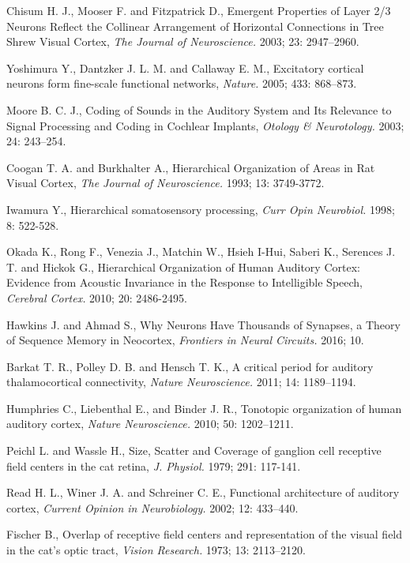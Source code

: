 \documentclass[11pt,a4paper]{article}
\begin{document}
\begin{thebibliography}{9}
  Chisum H. J., Mooser F. and Fitzpatrick D.,
  Emergent Properties of Layer 2/3 Neurons Reflect the Collinear Arrangement of Horizontal Connections in Tree Shrew Visual Cortex,
  \emph{The Journal of Neuroscience.} 2003; 23: 2947–2960.

  Yoshimura Y., Dantzker J. L. M. and Callaway E. M.,
  Excitatory cortical neurons form fine-scale functional networks,
  \emph{Nature.} 2005; 433: 868–873.

  Moore B. C. J.,
  Coding of Sounds in the Auditory System and Its Relevance to Signal Processing and Coding in Cochlear Implants,
  \emph{Otology \& Neurotology.} 2003; 24: 243–254.

  Coogan T. A. and Burkhalter A.,
  Hierarchical Organization of Areas in Rat Visual Cortex,
  \emph{The Journal of Neuroscience.} 1993; 13: 3749-3772.

  Iwamura Y.,
  Hierarchical somatosensory processing,
  \emph{Curr Opin Neurobiol.} 1998; 8: 522-528.

  Okada K., Rong F., Venezia J., Matchin W., Hsieh I-Hui, Saberi K., Serences J. T. and Hickok G.,
  Hierarchical Organization of Human Auditory Cortex: Evidence from Acoustic Invariance in the Response to Intelligible Speech,
  \emph{Cerebral Cortex.} 2010; 20: 2486-2495.

  Hawkins J. and Ahmad S.,
  Why Neurons Have Thousands of Synapses, a Theory of Sequence Memory in Neocortex,
  \emph{Frontiers in Neural Circuits.} 2016; 10.

  Barkat T. R., Polley D. B. and Hensch T. K.,
  A critical period for auditory thalamocortical connectivity,
  \emph{Nature Neuroscience.} 2011; 14: 1189–1194.

  Humphries C., Liebenthal E., and Binder J. R.,
  Tonotopic organization of human auditory cortex,
  \emph{Nature Neuroscience.} 2010; 50: 1202–1211.

  Peichl L. and Wassle H.,
  Size, Scatter and Coverage of ganglion cell receptive field centers in the cat retina,
  \emph{J. Physiol.} 1979; 291: 117-141.

  Read H. L., Winer J. A. and Schreiner C. E.,
  Functional architecture of auditory cortex,
  \emph{Current Opinion in Neurobiology.} 2002; 12: 433–440.

  Fischer B.,
  Overlap of receptive field centers and representation of the visual field in the cat's optic tract,
  \emph{Vision Research.} 1973; 13: 2113–2120.


\end{thebibliography}
\end{document}
